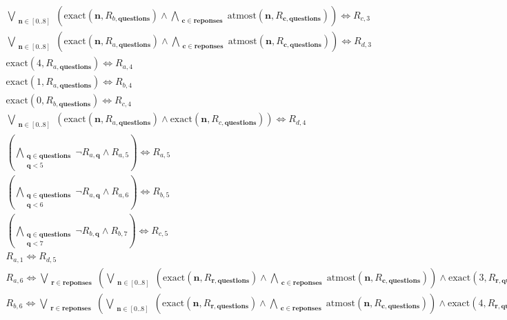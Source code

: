 \documentclass[fleqn]{article}
\begin{document}
\begin{multline*}
\bigvee\limits_{\substack{\mathbf{n}\in [0..8]}}\left(\textrm{exact}(\mathbf{n},R_{b,\mathbf{questions}}) \wedge \bigwedge\limits_{\substack{\mathbf{c}\in \mathbf{reponses}}}\textrm{atmost}(\mathbf{n},R_{\mathbf{c},\mathbf{questions}})\right) \Leftrightarrow R_{c,3}\\
\bigvee\limits_{\substack{\mathbf{n}\in [0..8]}}\left(\textrm{exact}(\mathbf{n},R_{a,\mathbf{questions}}) \wedge \bigwedge\limits_{\substack{\mathbf{c}\in \mathbf{reponses}}}\textrm{atmost}(\mathbf{n},R_{\mathbf{c},\mathbf{questions}})\right) \Leftrightarrow R_{d,3}\\
\textrm{exact}(4,R_{a,\mathbf{questions}}) \Leftrightarrow R_{a,4}\\
\textrm{exact}(1,R_{a,\mathbf{questions}}) \Leftrightarrow R_{b,4}\\
\textrm{exact}(0,R_{b,\mathbf{questions}}) \Leftrightarrow R_{c,4}\\
\bigvee\limits_{\substack{\mathbf{n}\in [0..8]}}\left(\textrm{exact}(\mathbf{n},R_{a,\mathbf{questions}}) \wedge \textrm{exact}(\mathbf{n},R_{c,\mathbf{questions}})\right) \Leftrightarrow R_{d,4}\\
\left(\bigwedge\limits_{\substack{\mathbf{q}\in \mathbf{questions}\\\mathbf{q} < 5}}\neg R_{a,\mathbf{q}} \wedge R_{a,5}\right) \Leftrightarrow R_{a,5}\\
\left(\bigwedge\limits_{\substack{\mathbf{q}\in \mathbf{questions}\\\mathbf{q} < 6}}\neg R_{a,\mathbf{q}} \wedge R_{a,6}\right) \Leftrightarrow R_{b,5}\\
\left(\bigwedge\limits_{\substack{\mathbf{q}\in \mathbf{questions}\\\mathbf{q} < 7}}\neg R_{b,\mathbf{q}} \wedge R_{b,7}\right) \Leftrightarrow R_{c,5}\\
R_{a,1} \Leftrightarrow R_{d,5}\\
R_{a,6} \Leftrightarrow \bigvee\limits_{\substack{\mathbf{r}\in \mathbf{reponses}}}\left(\bigvee\limits_{\substack{\mathbf{n}\in [0..8]}}\left(\textrm{exact}(\mathbf{n},R_{\mathbf{r},\mathbf{questions}}) \wedge \bigwedge\limits_{\substack{\mathbf{c}\in \mathbf{reponses}}}\textrm{atmost}(\mathbf{n},R_{\mathbf{c},\mathbf{questions}})\right) \wedge \textrm{exact}(3,R_{\mathbf{r},\mathbf{questions}})\right)\\
R_{b,6} \Leftrightarrow \bigvee\limits_{\substack{\mathbf{r}\in \mathbf{reponses}}}\left(\bigvee\limits_{\substack{\mathbf{n}\in [0..8]}}\left(\textrm{exact}(\mathbf{n},R_{\mathbf{r},\mathbf{questions}}) \wedge \bigwedge\limits_{\substack{\mathbf{c}\in \mathbf{reponses}}}\textrm{atmost}(\mathbf{n},R_{\mathbf{c},\mathbf{questions}})\right) \wedge \textrm{exact}(4,R_{\mathbf{r},\mathbf{questions}})\right)\\

\end{multline*}
\end{document}
